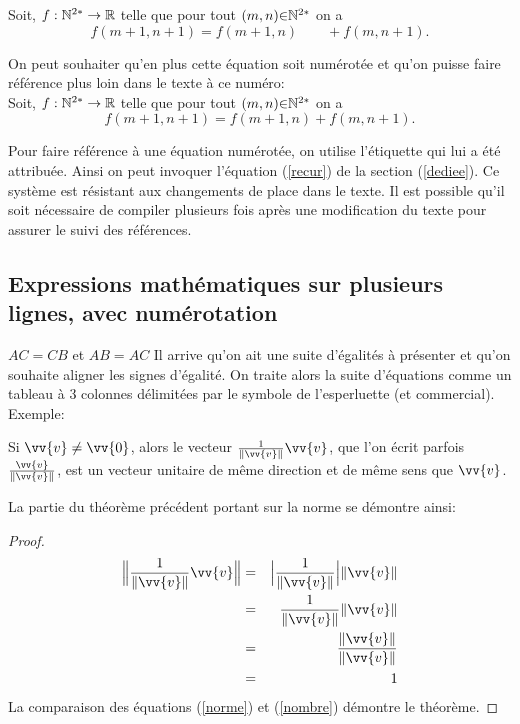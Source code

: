 Soit, $f: \Bbb{N} ^{2*} \rightarrow \Bbb{R}$ telle que pour tout $(m, n) {\in} \Bbb{N} ^{2*} $ on a
\begin{equation*}
f(m+1,n+1) = f(m+1,n) \qquad+ f(m,n+1).
\end{equation*}

On peut souhaiter qu'en plus cette équation soit numérotée et qu'on puisse faire référence plus loin dans le texte à ce numéro:\\
Soit, $f: \Bbb{N} ^{2*} \rightarrow \Bbb{R}$ telle que pour tout $(m, n) {\in} \Bbb{N} ^{2*} $ on a
\begin{equation}
f(m+1,n+1) = f(m+1,n) + f(m,n+1). \label{recur}
\end{equation}

Pour faire référence à une équation numérotée, on utilise l'étiquette qui lui a été attribuée. Ainsi on peut invoquer l'équation (\ref{recur}) de la section (\ref{dediee}). Ce système est résistant aux changements de place dans le texte. Il est possible qu'il soit nécessaire de compiler plusieurs fois après une modification du texte pour assurer le suivi des références.

\subsection{Expressions mathématiques sur plusieurs lignes, avec numérotation }\label{numero} 

$AC=CB$ et $AB=AC$
Il arrive qu'on ait une suite d'égalités à présenter et qu'on souhaite aligner les signes d'égalité.
On traite alors la suite d'équations comme un tableau à 3 colonnes délimitées  par le symbole de l'esperluette (et commercial).
\newpage
Exemple:

\begin{theorem} Si $\vv{v} \neq \vv{0}$, alors le vecteur $\frac{1}{\| \vv{v}\|}\vv{v}$, que l'on écrit parfois $\frac{\vv{v}}{\| \vv{v}\|}$, est un vecteur unitaire de même direction et de même sens que $\vv{v}$.
\end{theorem}

La partie du théorème précédent portant sur la norme se démontre ainsi:

\begin{proof}
\begin{eqnarray}
\Big\|{\frac{1}{\| \vv{v}\|}\vv{v}} \Big\|&=& \Big |\frac{1}{\| \vv{v}\|} \Big |\| \vv{v}\|\label{norme}\\
&=&\frac{1}{\| \vv{v}\|}\| \vv{v}\|  \nonumber\\
&=&\frac{\| \vv{v}\|}{\| \vv{v}\|} \nonumber\\
&=&1 \label{nombre}
\end{eqnarray}
La comparaison des équations (\ref{norme}) et (\ref{nombre}) démontre le théorème.\end{proof}


